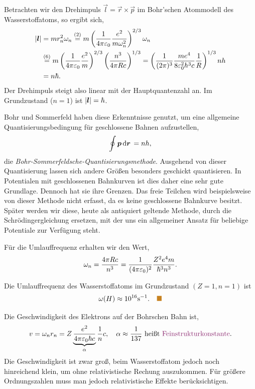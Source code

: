 Betrachten wir den Drehimpuls $\vec{l} = \vec{r}\times\vec{p}$ im Bohr'schen
Atommodell des Wasserstoffatoms, so ergibt sich,
\begin{align*}
\left|\bm{l}\right| &= mr_n^2\omega_n \overset{(2)}{=}
m\left(\frac{1}{4\pi\varepsilon_0}\frac{e^2}{m\omega_n^2}\right)^{2/3}\omega_n\\
&\overset{(6)}{=} m\left(\frac{1}{4\pi\varepsilon_0}\frac{e^2}{m}\right)^{2/3}
\left(\frac{n^3}{4\pi R c}\right)^{1/3}
=\left(\frac{1}{(2\pi)^3}\frac{me^4}{8\varepsilon_0^2h^3c}\frac{1}{R} \right)^{1/3}nh
 \\
&= n\hbar.
\end{align*}
Der Drehimpuls steigt also linear mit der Hauptquantenzahl an. Im Grundzustand
($n=1$) ist $\left|\bm{l}\right|=\hbar$.
\begin{bemn}
Bohr und Sommerfeld haben diese Erkenntnisse genutzt, um eine allgemeine
Quantisierungsbedingung für geschlossene Bahnen aufzustellen,
\begin{align*}
\oint \bm{p} \,\mathrm{d}\bm{r}\, =n h,
\end{align*}
die \emph{Bohr-Sommerfeldsche-Quantisierungsmethode}.
Ausgehend von dieser Quantisierung lassen sich andere Größen besonders
geschickt quantisieren. In Potentialen mit geschlossenen Bahnkurven ist
dies daher eine sehr gute Grundlage.
Dennoch hat sie ihre Grenzen. Das freie Teilchen wird beispielsweise von dieser
Methode nicht erfasst, da es keine geschlossene Bahnkurve besitzt. Später werden wir diese,
heute als antiquiert geltende Methode, durch die Schrödingergleichung ersetzen, 
mit der uns ein allgemeiner Ansatz für beliebige Potentiale zur Verfügung
steht.\maphere
\end{bemn}

Für die Umlauffrequenz erhalten wir den Wert,
\begin{align*}
\omega_n = \frac{4\pi Rc}{n^3} =
\frac{1}{(4\pi\varepsilon_0)^2}\frac{Z^2e^4m}{\hbar^3n^3}.
\end{align*}
\begin{bspn}
Die Umlauffrequenz des Wasserstoffatoms im Grundzustand $(Z=1,n=1)$ ist
\begin{align*}
\omega(H) \approx 10^{16}\mathrm{s}^{-1}.\bsphere
\end{align*}
\end{bspn}

Die Geschwindigkeit des Elektrons auf der Bohrschen Bahn ist,
\begin{align*}
v = \omega_n r_n = Z\underbrace{\frac{e^2}{4\pi\ep_0\hbar
c}}_{\alpha}\frac{1}{n}c,\quad
\alpha\approx\frac{1}{137}\text{ heißt \emph{Feinstrukturkonstante}}.
\end{align*}
Die Geschwindigkeit ist zwar groß, beim Wasserstoffatom jedoch noch hinreichend
klein, um ohne relativistische Rechung auszukommen. Für größere Ordnungszahlen
muss man jedoch relativistische Effekte berücksichtigen.


